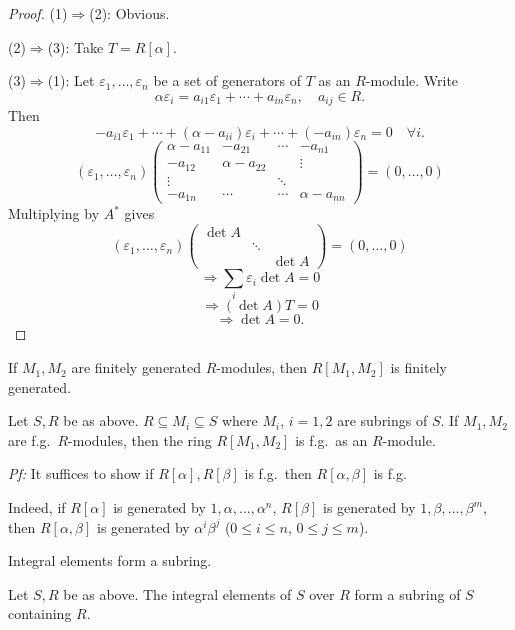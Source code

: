 \documentclass[11pt, a4paper]{report}
\begin{document}
\begin{proof}
(1)$\Rightarrow$(2): Obvious.

(2)$\Rightarrow$(3): Take $T=R[\alpha]$.

(3)$\Rightarrow$(1): Let $\varepsilon_{1}, \ldots, \varepsilon_{n}$ be a set of generators of $T$ as an $R$-module. Write
\[
\alpha \varepsilon_{i}=a_{i1} \varepsilon_{1}+\cdots+a_{in} \varepsilon_{n}, \quad a_{ij} \in R.
\]
Then
\[
-a_{i1} \varepsilon_{1}+\cdots+(\alpha-a_{ii}) \varepsilon_{i}+\cdots+(-a_{in}) \varepsilon_{n}=0 \quad \forall i.
\]
\[
\left(\varepsilon_{1}, \ldots, \varepsilon_{n}\right)\begin{pmatrix}
\alpha-a_{11} & -a_{21} & \cdots & -a_{n1} \\
-a_{12} & \alpha-a_{22} & & \vdots \\
\vdots & & \ddots & \\
-a_{1n} & \cdots & \cdots & \alpha-a_{nn}
\end{pmatrix}=\left(0, \ldots, 0\right)
\]
Multiplying by $A^{*}$ gives
\[
\left(\varepsilon_{1}, \ldots, \varepsilon_{n}\right)\begin{pmatrix}
\det A & & \\
& \ddots & \\
& & \det A
\end{pmatrix}=(0, \ldots, 0)
\]
\[
\Rightarrow \sum_{i} \varepsilon_{i} \det A = 0
\]
\[
\Rightarrow (\det A) T=0
\]
\[
\Rightarrow \det A=0.
\]
\end{proof}

\begin{lemma}
If $M_{1}, M_{2}$ are finitely generated $R$-modules, then $R[M_{1}, M_{2}]$ is finitely generated.
\end{lemma}
Let $S, R$ be as above. $R \subseteq M_{i} \subseteq S$ where $M_{i}$, $i=1,2$ are subrings of $S$. If $M_{1}, M_{2}$ are f.g.\ $R$-modules, then the ring $R[M_{1}, M_{2}]$ is f.g.\ as an $R$-module.

\textit{Pf:} It suffices to show if $R[\alpha], R[\beta]$ is f.g.\ then $R[\alpha, \beta]$ is f.g.

Indeed, if $R[\alpha]$ is generated by $1, \alpha, \ldots, \alpha^{n}$, $R[\beta]$ is generated by $1, \beta, \ldots, \beta^{m}$, then $R[\alpha, \beta]$ is generated by $\alpha^{i} \beta^{j}$ ($0 \leqslant i \leqslant n$, $0 \leqslant j \leqslant m$).


\begin{theorem}
Integral elements form a subring.

Let $S, R$ be as above. The integral elements of $S$ over $R$ form a subring of $S$ containing $R$.
\end{theorem}
\end{document}

